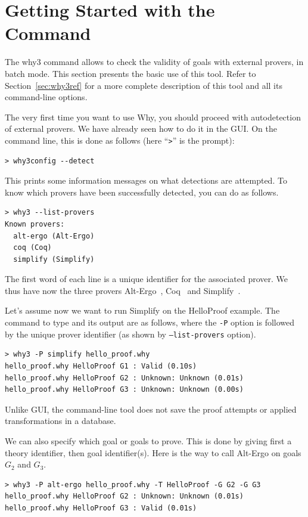 \section{Getting Started with the \why Command}
\label{sec:batch}

The why3 command allows to check the validity of goals with external
provers, in batch mode. This section presents the basic use of this
tool. Refer to Section~\ref{sec:why3ref} for a more complete
description of this tool and all its command-line options.

The very first time you want to use Why, you should proceed with
autodetection of external provers. We have already seen how to do
it in the \why GUI. On the command line, this is done as follows
(here ``\texttt{>}'' is the prompt):
\begin{verbatim}
> why3config --detect
\end{verbatim}
This prints some information messages on what detections are attempted. To know which
provers have been successfully detected, you can do as follows.
\begin{verbatim}
> why3 --list-provers
Known provers:
  alt-ergo (Alt-Ergo)
  coq (Coq)
  simplify (Simplify)
\end{verbatim}
The first word of each line is a unique identifier for the associated prover. We thus
have now the three provers Alt-Ergo~\cite{ergo}, Coq~\cite{CoqArt} and
Simplify~\cite{simplify05}.

Let's assume now we want to run Simplify on the HelloProof
example. The command to type and its output are as follows, where the
\verb|-P| option is followed by the unique prover identifier (as shown
by \texttt{--list-provers} option).
\begin{verbatim}
> why3 -P simplify hello_proof.why
hello_proof.why HelloProof G1 : Valid (0.10s)
hello_proof.why HelloProof G2 : Unknown: Unknown (0.01s)
hello_proof.why HelloProof G3 : Unknown: Unknown (0.00s)
\end{verbatim}
Unlike \why GUI, the command-line tool does not save the proof attempts
or applied transformations in a database.

We can also specify which goal or goals to prove. This is done by giving
first a theory identifier, then goal identifier(s). Here is the way to
call Alt-Ergo on goals $G_2$ and $G_3$.
\begin{verbatim}
> why3 -P alt-ergo hello_proof.why -T HelloProof -G G2 -G G3
hello_proof.why HelloProof G2 : Unknown: Unknown (0.01s)
hello_proof.why HelloProof G3 : Valid (0.01s)
\end{verbatim}

